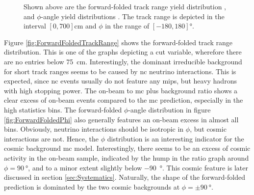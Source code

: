 \begin{figure}[htbp]
    \centering
    \caption[Forward-Folded Track Range and $\phi$-Angle Distributions]{Shown above are the forward-folded track range yield distribution , and $\phi$-angle yield distributions . The track range is depicted in the interval $[0,700] \si{\centi\metre}$ and $\phi$ in the range of $[-180,180] \si{\degree}$.}
    \label{fig:ForwardFoldedRangePhi}
\end{figure}
Figure \ref{fig:ForwardFoldedTrackRange} shows the forward-folded track range distribution. This is one of the graphs depicting a cut variable, wherefore there are no entries below \SI{75}{\centi\metre}. Interestingly, the dominant irreducible background for short track ranges seems to be caused by \gls{nc} neutrino interactions. This is expected, since \gls{nc} events usually do not feature any \glspl{mip}, but heavy hadrons with high stopping power. The on-beam to \gls{mc} plus background ratio shows a clear excess of on-beam events compared to the \gls{mc} prediction, especially in the high statistics bins. The forward-folded $\phi$-angle distribution in figure \ref{fig:ForwardFoldedPhi} also generally features an on-beam excess in almost all bins. Obviously, neutrino interactions should be isotropic in $\phi$, but cosmic interactions are not. Hence, the $\phi$ distribution is an interesting indicator for the cosmic background \gls{mc} model. Interestingly, there seems to be an excess of cosmic activity in the on-beam sample, indicated by the hump in the ratio graph around $\phi = \SI{90}{\degree}$, and to a minor extent slightly below \SI{-90}{\degree}. This cosmic feature is later discussed in section \ref{sec:Systematics}. Naturally, the shape of the forward-folded prediction is dominated by the two cosmic backgrounds at $\phi = \pm\SI{90}{\degree}$.

